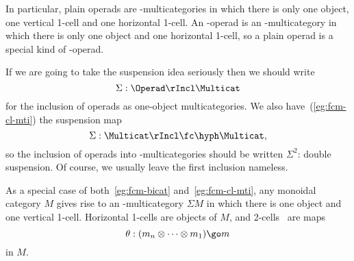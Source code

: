 \begin{example}	
In particular, plain operads are \fc-multicategories in which there is only
one object, one vertical 1-cell and one horizontal 1-cell.  An \fc-operad%
%
%
is an \fc-multicategory in which there is only one object and one
horizontal 1-cell, so a plain operad is a special kind of \fc-operad.

If we are going to take the suspension%
%
%
%
%
%
idea seriously then we should write
\[
\Sigma: \Operad \rIncl \Multicat
\]
for the inclusion of operads as one-object multicategories.  We also
have~(\ref{eg:fcm-cl-mti}) the suspension map
\[
\Sigma: \Multicat \rIncl \fc\hyph\Multicat,
\]
so the inclusion of operads into \fc-multicategories should be written
$\Sigma^2$: double suspension.  Of course, we usually leave the first
inclusion nameless.
\end{example}

\begin{example}	
As a special case of both~\ref{eg:fcm-bicat} and~\ref{eg:fcm-cl-mti}, any
monoidal%
%
%
%
%
category $M$ gives rise to an \fc-multicategory $\Sigma M$ in
which there is one object and one vertical 1-cell.  Horizontal 1-cells are
objects of $M$, and 2-cells~ are maps 
\[
\theta: (m_n \otimes\cdots\otimes m_1) \go m
\]
in $M$.  
\end{example}

